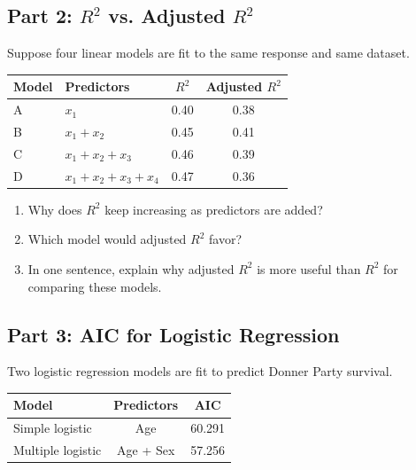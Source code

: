 \documentclass{article}
\newcommand{\blankline}[1]{\underline{\hspace{#1}}}
\begin{document}
\subsection*{Part 2: $R^2$ vs. Adjusted $R^2$}
Suppose four linear models are fit to the same response and same dataset.

\begin{center}
\renewcommand{\arraystretch}{1.35}
\begin{tabularx}{\textwidth}{lXcc}
\toprule
\textbf{Model} & \textbf{Predictors} & \boldmath$R^2$ & \textbf{Adjusted }\boldmath$R^2$ \\
\midrule
A & $x_1$ & 0.40 & 0.38 \\
B & $x_1+x_2$ & 0.45 & 0.41 \\
C & $x_1+x_2+x_3$ & 0.46 & 0.39 \\
D & $x_1+x_2+x_3+x_4$ & 0.47 & 0.36 \\
\bottomrule
\end{tabularx}
\end{center}

\begin{enumerate}[label={\bfseries (\Alph*)},itemsep=.8em]
\item Why does $R^2$ keep increasing as predictors are added? \\[3em]
\item Which model would adjusted $R^2$ favor? \hfill \blankline{1.2in}
\item In one sentence, explain why adjusted $R^2$ is more useful than $R^2$ for comparing these models. \\[4em]
\end{enumerate}

\subsection*{Part 3: AIC for Logistic Regression}
Two logistic regression models are fit to predict Donner Party survival.

\begin{center}
\renewcommand{\arraystretch}{1.35}
\begin{tabular}{lcc}
\toprule
\textbf{Model} & \textbf{Predictors} & \textbf{AIC} \\
\midrule
Simple logistic & Age & 60.291 \\
Multiple logistic & Age + Sex & 57.256 \\
\bottomrule
\end{tabular}
\end{center}
\end{document}
